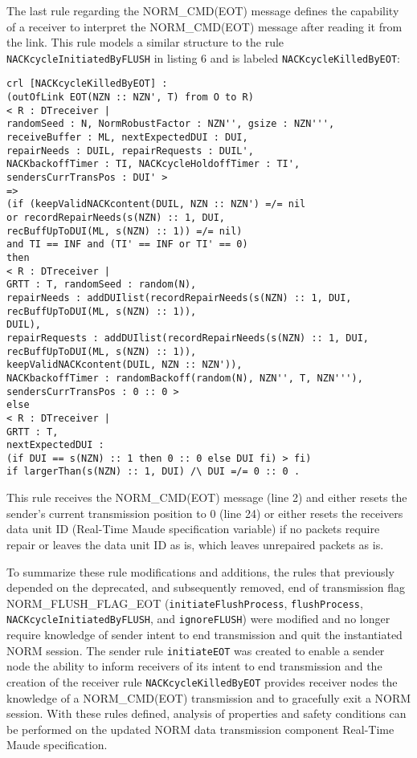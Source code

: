 \documentclass[10pt, journal]{IEEEtran}
\begin{document}
The last rule regarding the NORM\_CMD(EOT) message defines the capability of a receiver to interpret the NORM\_CMD(EOT) message after reading it from the link. This rule models a similar structure to the rule \texttt{NACKcycleInitiatedByFLUSH} in listing 6 and is labeled \texttt{NACKcycleKilledByEOT}:
\begin{lstlisting}[caption=Rule defining Receiver Killing EOT, label=lst9:mxm,]
crl [NACKcycleKilledByEOT] :
(outOfLink EOT(NZN :: NZN', T) from O to R)
< R : DTreceiver |
randomSeed : N, NormRobustFactor : NZN'', gsize : NZN''', 
receiveBuffer : ML, nextExpectedDUI : DUI,
repairNeeds : DUIL, repairRequests : DUIL', 
NACKbackoffTimer : TI, NACKcycleHoldoffTimer : TI',
sendersCurrTransPos : DUI' >
=>
(if (keepValidNACKcontent(DUIL, NZN :: NZN') =/= nil
or recordRepairNeeds(s(NZN) :: 1, DUI, 
recBuffUpToDUI(ML, s(NZN) :: 1)) =/= nil) 
and TI == INF and (TI' == INF or TI' == 0)
then
< R : DTreceiver | 
GRTT : T, randomSeed : random(N),
repairNeeds : addDUIlist(recordRepairNeeds(s(NZN) :: 1, DUI, 
recBuffUpToDUI(ML, s(NZN) :: 1)),
DUIL),
repairRequests : addDUIlist(recordRepairNeeds(s(NZN) :: 1, DUI, 
recBuffUpToDUI(ML, s(NZN) :: 1)),
keepValidNACKcontent(DUIL, NZN :: NZN')),
NACKbackoffTimer : randomBackoff(random(N), NZN'', T, NZN'''),
sendersCurrTransPos : 0 :: 0 >
else 
< R : DTreceiver |
GRTT : T, 
nextExpectedDUI : 
(if DUI == s(NZN) :: 1 then 0 :: 0 else DUI fi) > fi)  
if largerThan(s(NZN) :: 1, DUI) /\ DUI =/= 0 :: 0 .
\end{lstlisting}

This rule receives the NORM\_CMD(EOT) message (line 2) and either resets the sender's current transmission position to 0 (line 24) or  either resets the receivers data unit ID (Real-Time Maude specification variable) if no packets require repair or leaves the data unit ID as is, which leaves unrepaired packets as is.

To summarize these rule modifications and additions, the rules that previously depended on the deprecated, and subsequently removed, end of transmission flag NORM\_FLUSH\_FLAG\_EOT (\texttt{initiateFlushProcess}, \texttt{flushProcess}, \texttt{NACKcycleInitiatedByFLUSH}, and \texttt{ignoreFLUSH}) were modified and no longer require knowledge of sender intent to end transmission and quit the instantiated NORM session. The sender rule \texttt{initiateEOT} was created to enable a sender node the ability to inform receivers of its intent to end transmission and the creation of the receiver rule \texttt{NACKcycleKilledByEOT} provides receiver nodes the knowledge of a NORM\_CMD(EOT) transmission and to gracefully exit a NORM session. With these rules defined, analysis of properties and safety conditions can be performed on the updated NORM data transmission component Real-Time Maude specification.
\end{document}
